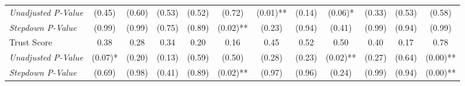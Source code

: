 \begin{tabular}{l c c c c c c c c c c c}
\quad \textit{Unadjusted P-Value} & (0.45) & (0.60) & (0.53) & (0.52) & (0.72) & (0.01)** & (0.14) & (0.06)* & (0.33) & (0.53) & (0.58) \\
\quad \textit{Stepdown P-Value} & (0.99) & (0.99) & (0.75) & (0.89) & (0.02)** & (0.23) & (0.94) & (0.41) & (0.99) & (0.94) & (0.99) \\
Trust Score & 0.38 & 0.28 & 0.34 & 0.20 & 0.16 & 0.45 & 0.52 & 0.50 & 0.40 & 0.17 & 0.78 \\
\quad \textit{Unadjusted P-Value} & (0.07)* & (0.20) & (0.13) & (0.59) & (0.50) & (0.28) & (0.23) & (0.02)** & (0.27) & (0.64) & (0.00)** \\
\quad \textit{Stepdown P-Value} & (0.69) & (0.98) & (0.41) & (0.89) & (0.02)** & (0.97) & (0.96) & (0.24) & (0.99) & (0.94) & (0.00)** \\
\bottomrule
\end{tabular}

